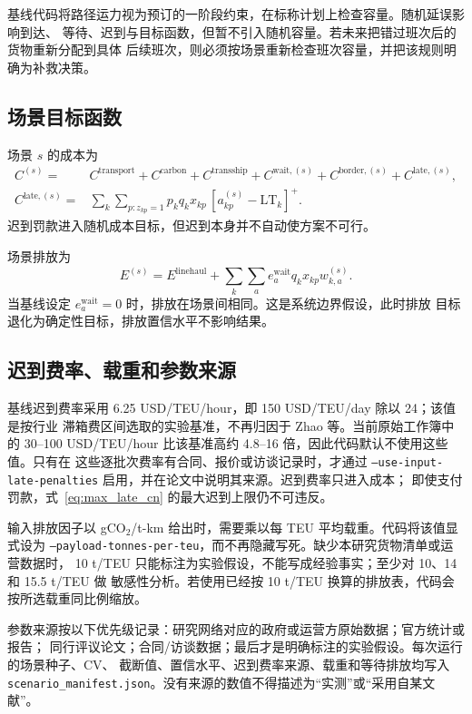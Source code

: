 基线代码将路径运力视为预订的一阶段约束，在标称计划上检查容量。随机延误影响到达、
等待、迟到与目标函数，但暂不引入随机容量。若未来把错过班次后的货物重新分配到具体
后续班次，则必须按场景重新检查班次容量，并把该规则明确为补救决策。

\subsection{场景目标函数}

场景 $s$ 的成本为
\begin{align}
 C^{(s)}={}&C^{\mathrm{transport}}+C^{\mathrm{carbon}}
 +C^{\mathrm{transship}}
 +C^{\mathrm{wait},(s)}+C^{\mathrm{border},(s)}
 +C^{\mathrm{late},(s)},\\
 C^{\mathrm{late},(s)}={}&
 \sum_k\sum_{p:z_{kp}=1}
 p_k q_kx_{kp}\,[a_{kp}^{(s)}-\mathrm{LT}_k]^+.
\end{align}
迟到罚款进入随机成本目标，但迟到本身并不自动使方案不可行。

场景排放为
\begin{equation}
 E^{(s)}=E^{\mathrm{linehaul}}+
 \sum_k\sum_a e_a^{\mathrm{wait}}q_kx_{kp}w_{k,a}^{(s)}.
\end{equation}
当基线设定 $e_a^{\mathrm{wait}}=0$ 时，排放在场景间相同。这是系统边界假设，此时排放
目标退化为确定性目标，排放置信水平不影响结果。

\subsection{迟到费率、载重和参数来源}

基线迟到费率采用 6.25 USD/TEU/hour，即 150 USD/TEU/day 除以 24；该值是按行业
滞箱费区间选取的实验基准，不再归因于 Zhao 等。当前原始工作簿中的
30--100 USD/TEU/hour 比该基准高约 4.8--16 倍，因此代码默认不使用这些值。只有在
这些逐批次费率有合同、报价或访谈记录时，才通过
\texttt{--use-input-late-penalties} 启用，并在论文中说明其来源。迟到费率只进入成本；
即使支付罚款，式~\eqref{eq:max_late_cn} 的最大迟到上限仍不可违反。

输入排放因子以 gCO$_2$/t-km 给出时，需要乘以每 TEU 平均载重。代码将该值显式设为
\texttt{--payload-tonnes-per-teu}，而不再隐藏写死。缺少本研究货物清单或运营数据时，
10 t/TEU 只能标注为实验假设，不能写成经验事实；至少对 10、14 和 15.5 t/TEU 做
敏感性分析。若使用已经按 10 t/TEU 换算的排放表，代码会按所选载重同比例缩放。

参数来源按以下优先级记录：研究网络对应的政府或运营方原始数据；官方统计或报告；
同行评议论文；合同/访谈数据；最后才是明确标注的实验假设。每次运行的场景种子、CV、
截断值、置信水平、迟到费率来源、载重和等待排放均写入
\texttt{scenario\_manifest.json}。没有来源的数值不得描述为“实测”或“采用自某文献”。

